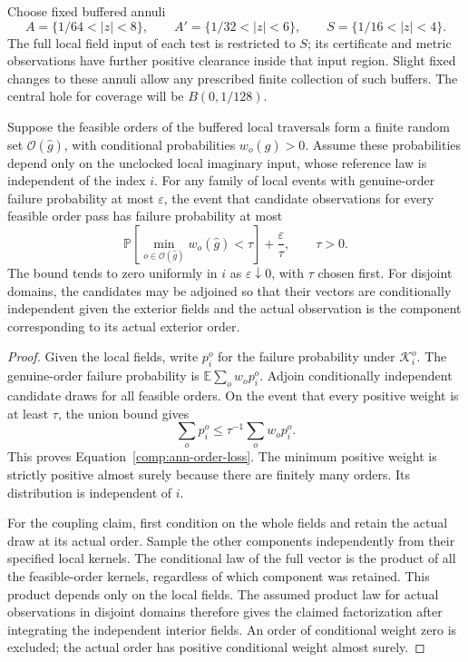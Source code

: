 Choose fixed buffered annuli
\[
 A=\{1/64<|z|<8\},\qquad
 A'=\{1/32<|z|<6\},\qquad
 S=\{1/16<|z|<4\}.
\]
The full local field input of each test is restricted to $S$; its
certificate and metric observations have further positive clearance
inside that input region.  Slight fixed changes to these annuli allow
any prescribed finite collection of such buffers.  The central hole for
coverage will be $B(0,1/128)$.

\begin{lemma}\label{comp:ann-orders}
Suppose the feasible orders of the buffered local traversals form a
finite random set $\mathcal O(\widehat g)$, with conditional probabilities
$w_o(\widehat g)>0$.  Assume these probabilities depend only on the
unclocked local imaginary input, whose reference law is independent of
the index $i$.  For any family of local events with genuine-order failure
probability at most $\varepsilon$, the event that candidate observations
for every feasible order pass has failure probability at most
\begin{equation}\label{comp:ann-order-loss}
 \mathbb P\!\left[
    \min_{o\in\mathcal O(\widehat g)}w_o(\widehat g)<\tau
 \right]+\frac{\varepsilon}{\tau},\qquad \tau>0.
\end{equation}
The bound tends to zero uniformly in $i$ as $\varepsilon\downarrow0$,
with $\tau$ chosen first.  For disjoint domains, the candidates may be
adjoined so that their vectors are conditionally independent given the
exterior fields and the actual observation is the component corresponding
to its actual exterior order.
\end{lemma}

\begin{proof}
Given the local fields, write $p_i^o$ for the failure probability under
$\mathcal K_i^o$.  The genuine-order failure probability is
$\mathbb E\sum_o w_op_i^o$.  Adjoin conditionally independent candidate
draws for all feasible orders.  On the event that every positive weight
is at least $\tau$, the union bound gives
\[
 \sum_o p_i^o\leq \tau^{-1}\sum_o w_op_i^o.
\]
This proves Equation~\eqref{comp:ann-order-loss}.  The minimum positive
weight is strictly positive almost surely because there are finitely many
orders.  Its distribution is independent of $i$.

For the coupling claim, first condition on the whole fields and retain
the actual draw at its actual order.  Sample the other components
independently from their specified local kernels.  The conditional law
of the full vector is the product of all the feasible-order kernels,
regardless of which component was retained.  This product depends only
on the local fields.  The assumed product law for actual observations
in disjoint domains therefore gives the claimed factorization after
integrating the independent interior fields.  An order of conditional
weight zero is excluded; the actual order has positive conditional weight
almost surely.
\end{proof}

